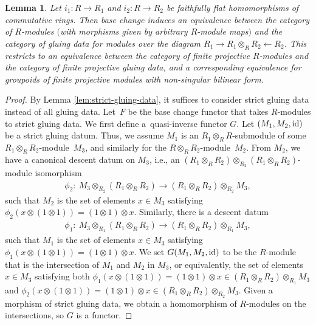 \documentclass[pdftex]{sigma}
\newtheorem{lem}[thm]{Lemma}
\theoremstyle{definition}
\begin{document}
\begin{lem} \label{lem:faithfully-flat-gluing-data-for-flat-modules}Let $i_1\colon R \to R_1$ and $i_2\colon R \to R_2$ be faithfully flat homomorphisms of commutative rings. Then base change induces an equivalence between the category of $R$-modules $($with morphisms given by arbitrary $R$-module maps$)$ and the category of gluing data for modules over the diagram $R_1 \to R_1 \otimes_{R} R_2 \leftarrow R_2$. This restricts to an equivalence between the category of finite projective $R$-modules and the category of finite projective gluing data, and a corresponding equivalence for groupoids of finite projective modules with non-singular bilinear form.
\end{lem}
\begin{proof}By Lemma \ref{lem:strict-gluing-data}, it suffices to consider strict gluing data instead of all gluing data. Let~$F$ be the base change functor that takes $R$-modules to strict gluing data. We first define a~quasi-inverse functor $G$. Let $(M_1, M_2, {\rm id})$ be a strict gluing datum. Thus, we assume $M_1$ is an $R_1 \otimes_{R} R$-submodule of some $R_1 \otimes_{R} R_2$-module~$M_3$, and similarly for the $R \otimes_{R} R_2$-module~$M_2$. From $M_2$, we have a canonical descent datum on $M_3$, i.e., an $(R_1 \otimes_{R} R_2) \otimes_{R_2} (R_1 \otimes_{R} R_2)$-module isomorphism
\begin{gather*} \phi_2\colon \ M_3 \otimes_{R_2}(R_1 \otimes_{R} R_2) \to (R_1 \otimes_{R} R_2) \otimes_{R_2} M_3, \end{gather*}
such that $M_2$ is the set of elements $x \in M_3$ satisfying $\phi_2(x \otimes (1 \otimes 1)) = (1 \otimes 1) \otimes x$. Similarly, there is a descent datum
\begin{gather*} \phi_1\colon \ M_3 \otimes_{R_1}(R_1 \otimes_{R} R_2) \to (R_1 \otimes_{R} R_2) \otimes_{R_1} M_3, \end{gather*}
such that $M_1$ is the set of elements $x \in M_3$ satisfying $\phi_1(x \otimes (1 \otimes 1)) = (1 \otimes 1) \otimes x$. We set $G(M_1, M_2,{\rm id})$ to be the $R$-module that is the intersection of $M_1$ and $M_2$ in $M_3$, or equivalently, the set of elements $x \in M_3$ satisfying both $\phi_1(x \otimes (1 \otimes 1)) = (1 \otimes 1) \otimes x \in (R_1 \otimes_{R} R_2) \otimes_{R_1} M_3$ and $\phi_2(x \otimes (1 \otimes 1)) = (1 \otimes 1) \otimes x \in (R_1 \otimes_{R} R_2) \otimes_{R_2} M_3$. Given a morphism of strict gluing data, we obtain a homomorphism of $R$-modules on the intersections, so $G$ is a functor.


\end{proof}
\end{document}
